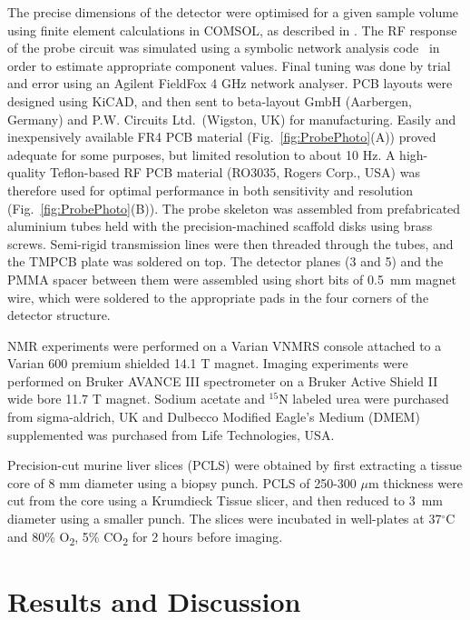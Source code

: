 \documentclass[preprint,5p]{elsarticle}
\newcommand{\fig}[1]{Fig.~\ref{#1}}
\begin{document}
The precise dimensions of the detector were optimised for a given sample volume
using finite element calculations in COMSOL, as described in \cite{gream_2016}.
The RF response of the probe circuit was simulated using a symbolic network
analysis code~\cite{gream-thesis} in order to estimate appropriate component
values. Final tuning was done by trial and error using an Agilent FieldFox 4 GHz
network analyser. PCB layouts were designed using KiCAD, and then sent to
beta-layout GmbH (Aarbergen, Germany) and P.W. Circuits Ltd.~(Wigston, UK) for
manufacturing. Easily and inexpensively available FR4 PCB material
(\fig{fig:ProbePhoto}(A)) proved adequate for some purposes, but limited
resolution to about 10 Hz. A high-quality Teflon-based RF PCB material (RO3035,
Rogers Corp., USA) was therefore used for optimal performance in both
sensitivity and resolution (\fig{fig:ProbePhoto}(B)). The probe skeleton was
assembled from prefabricated aluminium tubes held with the precision-machined
scaffold disks using brass screws. Semi-rigid transmission lines were then
threaded through the tubes, and the TMPCB plate was soldered on top. The
detector planes (3 and 5) and the PMMA spacer between them were assembled using
short bits of 0.5~mm magnet wire, which were soldered to the appropriate pads in
the four corners of the detector structure.

NMR experiments were performed on a Varian VNMRS console attached to a Varian
600 premium shielded 14.1 T magnet. Imaging experiments were performed on Bruker
AVANCE III spectrometer on a Bruker Active Shield II wide bore 11.7 T magnet.
Sodium acetate and $^{15}$N labeled urea were purchased from sigma-aldrich, UK
and Dulbecco Modified Eagle's Medium (DMEM) supplemented was purchased from Life
Technologies, USA.

Precision-cut murine liver slices (PCLS) were obtained by first extracting a
tissue core of 8 mm diameter using a biopsy punch. PCLS of 250-300 $\mu$m
thickness were cut from the core using a Krumdieck Tissue slicer, and then
reduced to 3~mm diameter using a smaller punch. The slices were incubated in
well-plates at 37$^\circ$C and 80\% O\textsubscript{2}, 5\% CO\textsubscript{2}
for 2 hours before imaging.


\section{Results and Discussion}
\end{document}

